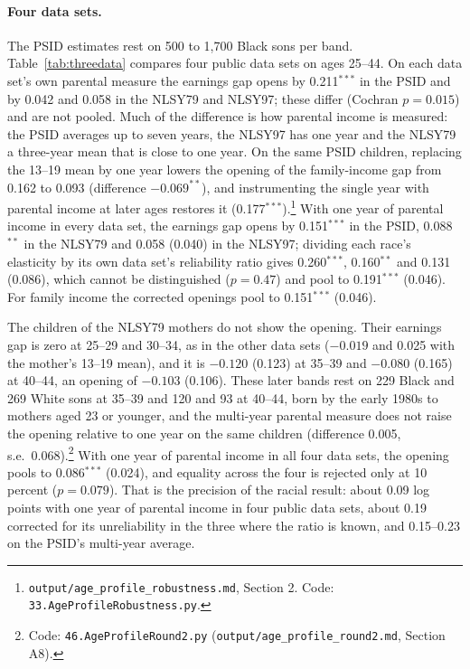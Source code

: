 \paragraph{Four data sets.} The PSID estimates rest on 500 to 1,700 Black sons per band. Table~\ref{tab:threedata}
compares four public data sets on ages 25--44. On each data set's own parental measure the earnings gap opens by
0.211$^{***}$ in the PSID and by 0.042 and 0.058 in the NLSY79 and NLSY97; these differ (Cochran $p=0.015$) and are not
pooled. Much of the difference is how parental income is measured: the PSID averages up to seven years, the NLSY97 has
one year and the NLSY79 a three-year mean that is close to one year. On the same PSID children, replacing the 13--19
mean by one year lowers the opening of the family-income gap from 0.162 to 0.093 (difference $-0.069^{**}$), and
instrumenting the single year with parental income at later ages restores it (0.177$^{***}$).\footnote{\texttt{output/age\_profile\_robustness.md},
Section 2. Code: \texttt{33.AgeProfileRobustness.py}.} With one year of parental income in every data set, the
earnings gap opens by 0.151$^{***}$ in the PSID, 0.088$^{**}$ in the NLSY79 and 0.058 (0.040) in the NLSY97; dividing each
race's elasticity by its own data set's reliability ratio gives 0.260$^{***}$, 0.160$^{**}$ and 0.131 (0.086), which
cannot be distinguished ($p=0.47$) and pool to 0.191$^{***}$ (0.046). For family income the corrected openings pool to
0.151$^{***}$ (0.046).

The children of the NLSY79 mothers do not show the opening. Their earnings gap is zero at 25--29 and 30--34, as in the
other data sets ($-0.019$ and 0.025 with the mother's 13--19 mean), and it is $-0.120$ (0.123) at 35--39 and $-0.080$
(0.165) at 40--44, an opening of $-0.103$ (0.106). These later bands rest on 229 Black and 269 White sons at 35--39 and
120 and 93 at 40--44, born by the early 1980s to mothers aged 23 or younger, and the multi-year parental measure does
not raise the opening relative to one year on the same children (difference 0.005, s.e.\ 0.068).\footnote{Code:
\texttt{46.AgeProfileRound2.py} (\texttt{output/age\_profile\_round2.md}, Section A8).} With one year of parental
income in all four data sets, the opening pools to 0.086$^{***}$ (0.024), and equality across the four is rejected only
at 10 percent ($p=0.079$). That is the precision of the racial result: about 0.09 log points with one year of parental
income in four public data sets, about 0.19 corrected for its unreliability in the three where the ratio is known, and
0.15--0.23 on the PSID's multi-year average.

